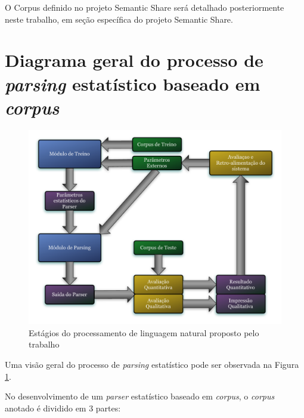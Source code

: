 O Corpus definido no projeto Semantic Share será detalhado posteriormente neste trabalho, em seção específica do projeto Semantic Share.


\section{Diagrama geral do processo de \emph{parsing} estatístico baseado em \emph{corpus}} %
\label{sec:diagrama_geral_do_processo_de_parsing_estatistico_baseado_em_corpus}

\begin{figure}
	\begin{center}
		\includegraphics[scale=0.5]{parser_schema.pdf}
		\caption{\label{schema} Estágios do processamento de linguagem natural proposto pelo trabalho}		
	\end{center}
\end{figure}

Uma visão geral do processo de \emph{parsing} estatístico pode ser observada na Figura \ref{schema}.

No desenvolvimento de um \emph{parser} estatístico baseado em \emph{corpus}, o \emph{corpus} anotado é dividido em 3 partes:

